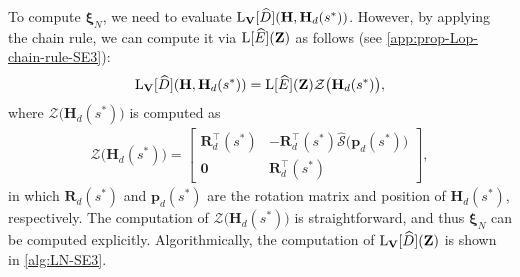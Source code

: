 To compute $\boldsymbol{\xi}_N$, we need to evaluate $\operatorname{L}_\mathbf{V}[\widehat{D}](\mathbf{H}, \mathbf{H}_d(s^*))$. However, by applying the chain rule, we can compute it via $\operatorname{L}[\widehat{E}](\mathbf{Z})$ as follows (see \cref{app:prop-Lop-chain-rule-SE3}):
\begin{align}
    \operatorname{L}_\mathbf{V}[\widehat{D}](\mathbf{H}, \mathbf{H}_d(s^*)) = \operatorname{L}[\widehat{E}](\mathbf{Z})\mathcal{Z}\bigl(\mathbf{H}_d(s^*)\bigr),
\end{align}
where $\mathcal{Z}\bigl(\mathbf{H}_d(s^*)\bigr)$ is computed as
\begin{align}
    \mathcal{Z}\bigl(\mathbf{H}_d(s^*)\bigr) = \begin{bmatrix}
        \mathbf{R}_d^\top(s^*) & -\mathbf{R}_d^\top(s^*)\widehat{\mathcal{S}}\bigl(\mathbf{p}_d(s^*)\bigr)\\
        \mathbf{0} & \mathbf{R}_d^\top(s^*)
    \end{bmatrix}, \label{eq:explicit-EE-dista-SE3-component-Zmap}
\end{align}
in which $\mathbf{R}_d(s^*)$ and $\mathbf{p}_d(s^*)$ are the rotation matrix and position of $\mathbf{H}_d(s^*)$, respectively. The computation of $\mathcal{Z}\bigl(\mathbf{H}_d(s^*)\bigr)$ is straightforward, and thus $\boldsymbol{\xi}_N$ can be computed explicitly. Algorithmically, the computation of $\operatorname{L}_\mathbf{V}[\widehat{D}]\textcolor{black}{(\mathbf{Z})}$ is shown in \cref{alg:LN-SE3}.
